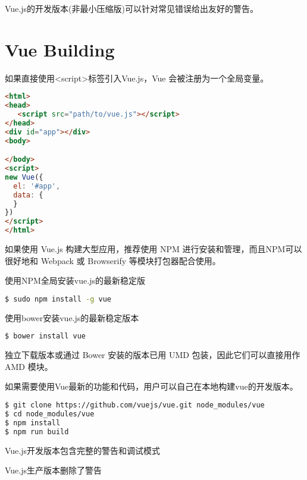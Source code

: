 Vue.js的开发版本(非最小压缩版)可以针对常见错误给出友好的警告。







\section{Vue Building}


如果直接使用<script>标签引入Vue.js，Vue 会被注册为一个全局变量。

\begin{lstlisting}[language=HTML]
<html>
<head>
   <script src="path/to/vue.js"></script>
</head>
<div id="app"></div>
<body>

</body>
<script>
new Vue({
  el: '#app',
  data: {
  }
})
</script>
</html>
\end{lstlisting}



如果使用 Vue.js 构建大型应用，推荐使用 NPM 进行安装和管理，而且NPM可以很好地和 Webpack 或 Browserify 等模块打包器配合使用。

\begin{compactitem}
\item 使用NPM全局安装vue.js的最新稳定版

\begin{lstlisting}[language=bash]
$ sudo npm install -g vue
\end{lstlisting}

\item 使用bower安装vue.js的最新稳定版本

\begin{lstlisting}[language=bash]
$ bower install vue
\end{lstlisting}
\end{compactitem}

独立下载版本或通过 Bower 安装的版本已用 UMD 包装，因此它们可以直接用作 AMD 模块。



如果需要使用Vue最新的功能和代码，用户可以自己在本地构建vue的开发版本。


\begin{lstlisting}[language=bash]
$ git clone https://github.com/vuejs/vue.git node_modules/vue
$ cd node_modules/vue
$ npm install
$ npm run build
\end{lstlisting}

\begin{compactitem}
\item Vue.js开发版本包含完整的警告和调试模式
\item Vue.js生产版本删除了警告
\end{compactitem}



